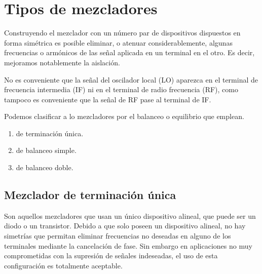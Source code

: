 \documentclass[conference]{IEEEtran}
\begin{document}
\section{Tipos de mezcladores}
Construyendo el mezclador con un número par de dispositivos dispuestos en forma simétrica es posible eliminar, o atenuar considerablemente, algunas frecuencias o armónicos de las señal aplicada en un terminal en el otro. Es decir, mejoramos notablemente la aislación.

No es conveniente que la señal del oscilador local (LO) aparezca en el terminal de frecuencia intermedia (IF) ni en el terminal de radio  frecuencia (RF), como tampoco  es conveniente  que  la  señal  de  RF  pase  al  terminal  de  IF.

Podemos clasificar a lo mezcladores por el balanceo o equilibrio que emplean.

\begin{enumerate}
	\item de terminación única.
	\item de balanceo simple.
	\item de balanceo doble.
\end{enumerate}

%

\subsection{Mezclador de terminación única}
Son aquellos mezcladores que usan un único dispositivo alineal, que puede ser un diodo o un transistor. Debido a que solo poseen un dispositivo alineal, no hay  simetrías que permitan eliminar frecuencias no deseadas en alguno de los terminales mediante la cancelación de fase. Sin embargo en aplicaciones  no  muy comprometidas con la supresión de señales indeseadas, el uso de  esta configuración  es totalmente aceptable. 
\end{document}
